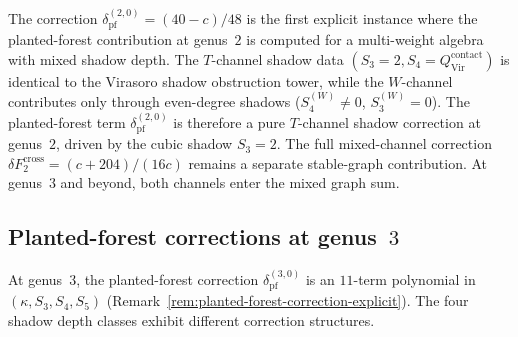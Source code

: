 \begin{remark}
\label{rem:w3-cross-channel-significance}
The correction
$\delta_{\mathrm{pf}}^{(2,0)} = (40 - c)/48$ is the first explicit
instance where the planted-forest contribution at genus~$2$ is
computed for a multi-weight algebra with mixed shadow depth.
The $T$-channel shadow data $(S_3 = 2, S_4 = Q^{\mathrm{contact}}_{\mathrm{Vir}})$
is identical to the Virasoro shadow obstruction tower, while the $W$-channel
contributes only through even-degree shadows ($S_4^{(W)} \neq 0$,
$S_3^{(W)} = 0$). The planted-forest term
$\delta_{\mathrm{pf}}^{(2,0)}$ is therefore a pure $T$-channel
shadow correction at genus~$2$, driven by the cubic shadow
$S_3 = 2$. The full mixed-channel correction
$\delta F_2^{\mathrm{cross}}=(c+204)/(16c)$ remains a separate
stable-graph contribution. At genus~$3$ and beyond, both channels
enter the mixed graph sum.
\end{remark}

\subsection{Planted-forest corrections at genus~$3$}
\label{subsec:planted-forest-genus3-landscape}

At genus~$3$, the planted-forest correction
$\delta_{\mathrm{pf}}^{(3,0)}$ is an $11$-term polynomial in
$(\kappa, S_3, S_4, S_5)$
(Remark~\ref{rem:planted-forest-correction-explicit}).
The four shadow depth classes exhibit different correction
structures.

